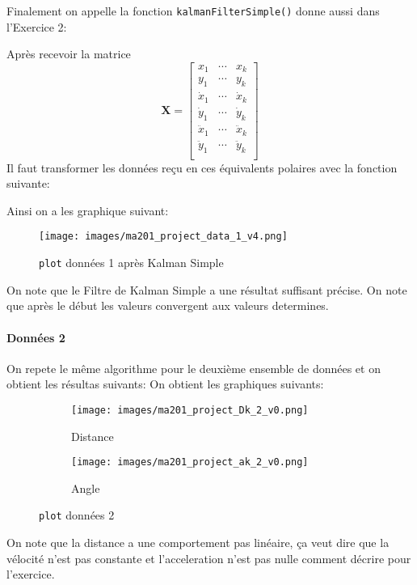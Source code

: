 \documentclass{article}
\begin{document}
\noindent Finalement on appelle la fonction \texttt{kalmanFilterSimple()} donne aussi dans l'Exercice 2:
\begin{scriptsize}\mycode
    
\end{scriptsize}
Après recevoir la matrice $$\mathbf{X} = 
\begin{bmatrix} 
    x_{1} & \cdots & x_{k}\\
    y_{1} & \cdots & y_{k}\\
    \dot{x}_{1} & \cdots & \dot{x}_{k}\\
    \dot{y}_{1} & \cdots & \dot{y}_{k}\\
    \ddot{x}_{1} & \cdots & \ddot{x}_{k}\\
    \ddot{y}_{1} & \cdots & \ddot{y}_{k}\\
\end{bmatrix}$$
Il faut transformer les données reçu en ces équivalents polaires avec la fonction suivante:
\begin{scriptsize}\mycode
    
\end{scriptsize}
Ainsi on a les graphique suivant:
\begin{figure}[H]
    \centering
    \texttt{[image: images/ma201\_project\_data\_1\_v4.png]}
    \caption{\texttt{plot} données 1 après Kalman Simple}
\end{figure}\noindent
On note que le Filtre de Kalman Simple a une résultat suffisant précise. On note que après le début les valeurs convergent aux valeurs determines.

\newpage\paragraph{Données 2}On repete le même algorithme pour le deuxième ensemble de données et on obtient les résultas suivants:
On obtient les graphiques suivants:
\begin{figure}[H]
    \centering
    \begin{subfigure}[H]{.45\textwidth}
        \centering
        \texttt{[image: images/ma201\_project\_Dk\_2\_v0.png]}
        \caption{Distance}
    \end{subfigure}
    \begin{subfigure}[H]{.45\textwidth}
        \centering
        \texttt{[image: images/ma201\_project\_ak\_2\_v0.png]}
        \caption{Angle}
    \end{subfigure}
    \caption{\texttt{plot} données 2}
\end{figure}\noindent
On note que la distance a une comportement pas linéaire, ça veut dire que la vélocité n'est pas constante et l'acceleration n'est pas nulle comment décrire pour l'exercice.\\
\end{document}
